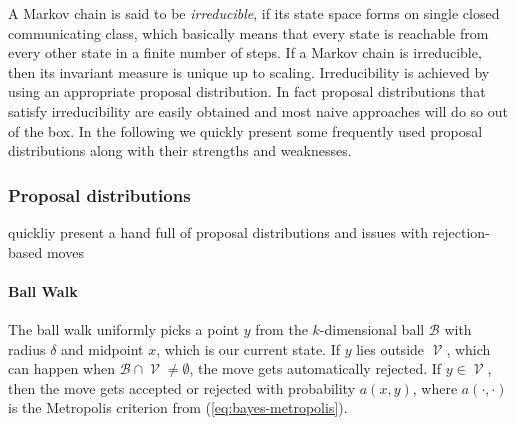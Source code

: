 \documentclass[10pt]{article}
\newcommand{\wrt}{w.r.t.~}
\DeclareMathOperator\fp{\mathcal{V}}
\newcommand{\todo}[1]{{\color{red}#1}}
\begin{document}
A Markov chain is said to be \emph{irreducible}, if its state space forms on single closed communicating class, 
which basically means that every state is reachable from every other state in a finite number of steps. 
If a Markov chain is irreducible, then its invariant measure is unique up to scaling. 
Irreducibility is achieved by using an appropriate proposal distribution.
In fact proposal distributions that satisfy irreducibility are easily obtained and most naive approaches will
do so out of the box.
In the following we quickly present some frequently used proposal distributions along with their strengths
and weaknesses.


\subsubsection{Proposal distributions}

\todo{quickliy present a hand full of proposal distributions and issues with rejection-based moves} 

\paragraph{Ball Walk}
The ball walk uniformly picks a point $y$ from the $k$-dimensional ball $\mathcal{B}$ with radius $\delta$ and 
midpoint $x$, which is our current state. If $y$ lies outside $\fp$, which can happen when 
$\mathcal{B} \cap \fp \neq \emptyset$, the move gets automatically rejected.
If $y \in \fp$, then the move gets accepted or rejected with probability $a(x, y)$, where $a(\cdot, \cdot)$ is 
the Metropolis criterion from (\ref{eq:bayes-metropolis}).
\end{document}
